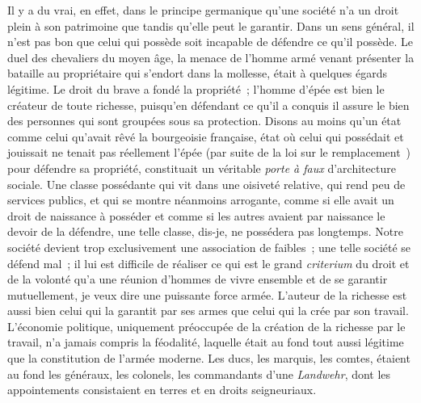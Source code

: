 \documentclass[french,twoside]{book} %
\begin{document}
Il y a du vrai, en effet, dans le principe germanique qu’une société n’a un droit plein à son patrimoine que tandis qu’elle peut le garantir. Dans un sens général, il n’est pas bon que celui qui possède soit incapable de défendre ce qu’il possède. Le duel des chevaliers du moyen âge, la menace de l’homme armé venant présenter la bataille au propriétaire qui s’endort dans la mollesse, était à quelques égards légitime. Le droit du brave a fondé la propriété ; l’homme d’épée est bien le créateur de toute richesse, puisqu’en défendant ce qu’il a conquis il assure le bien des personnes qui sont groupées sous sa protection. Disons au moins qu’un état comme celui qu’avait rêvé la bourgeoisie française, état où celui qui possédait et jouissait ne tenait pas réellement l’épée (par suite de la loi sur le remplacement ) pour défendre sa propriété, constituait un véritable {\itshape porte à faux} d’architecture sociale. Une classe possédante qui vit dans une oisiveté relative, qui rend peu de services publics, et qui se montre néanmoins arrogante, comme si elle avait un droit de naissance à posséder et comme si les autres avaient par naissance le devoir de la défendre, une telle classe, dis-je, ne possédera pas longtemps. Notre société devient trop exclusivement une association de faibles ; une telle société se défend mal ; il lui est difficile de réaliser ce qui est le grand {\itshape criterium} du droit et de la volonté qu’a une réunion d’hommes de vivre ensemble et de se garantir mutuellement, je veux dire une puissante force armée. L’auteur de la richesse est aussi bien celui qui la garantit par ses armes que celui qui la crée par son travail. L’économie politique, uniquement préoccupée de la création de la richesse par le travail, n’a jamais compris la féodalité, laquelle était au fond tout aussi légitime que la constitution de l’armée moderne. Les ducs, les marquis, les comtes, étaient au fond les généraux, les colonels, les commandants d’une {\itshape Landwehr}, dont les appointements consistaient en terres et en droits seigneuriaux.
\end{document}
